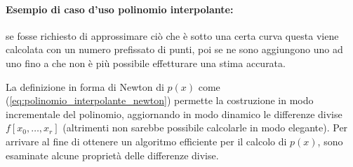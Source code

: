 \paragraph{Esempio di caso d'uso polinomio interpolante:} se fosse richiesto di approssimare ciò che è sotto una certa curva questa viene calcolata con un numero prefissato di punti, poi se ne sono aggiungono uno ad uno fino a che non è più possibile effetturare una stima accurata.

La definizione in forma di Newton di $p(x)$ come (\ref{eq:polinomio_interpolante_newton}) permette la costruzione in modo incrementale del polinomio, aggiornando in modo dinamico le differenze divise $f[x_0,\hdots, x_r]$ (altrimenti non sarebbe possibile calcolarle in modo elegante). Per arrivare al fine di ottenere un algoritmo efficiente per il calcolo di $p(x)$, sono esaminate alcune proprietà delle differenze divise.

